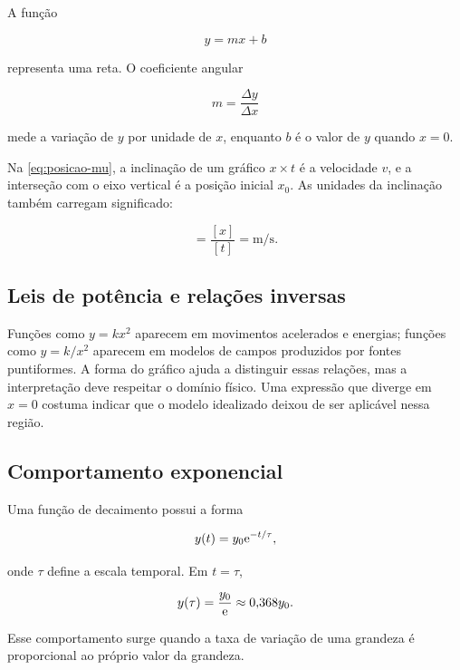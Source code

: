 A função

\begin{equation}
  y=mx+b
\end{equation}

representa uma reta. O coeficiente angular

\begin{equation}
  m=\frac{\Delta y}{\Delta x}
\end{equation}

mede a variação de $y$ por unidade de $x$, enquanto $b$ é o valor de $y$ quando $x=0$.

Na \cref{eq:posicao-mu}, a inclinação de um gráfico $x\times t$ é a velocidade $v$, e a interseção com o eixo vertical é a posição inicial $x_0$. As unidades da inclinação também carregam significado:

\begin{equation}
  [v]=\frac{[x]}{[t]}=\si{\meter\per\second}.
\end{equation}

\subsection{Leis de potência e relações inversas}

Funções como $y=kx^2$ aparecem em movimentos acelerados e energias; funções como $y=k/x^2$ aparecem em modelos de campos produzidos por fontes puntiformes. A forma do gráfico ajuda a distinguir essas relações, mas a interpretação deve respeitar o domínio físico. Uma expressão que diverge em $x=0$ costuma indicar que o modelo idealizado deixou de ser aplicável nessa região.

\subsection{Comportamento exponencial}

Uma função de decaimento possui a forma

\begin{equation}
  y(t)=y_0\mathrm{e}^{-t/\tau},
\end{equation}

onde $\tau$ define a escala temporal. Em $t=\tau$,

\begin{equation}
  y(\tau)=\frac{y_0}{\mathrm{e}}\approx 0{,}368y_0.
\end{equation}

Esse comportamento surge quando a taxa de variação de uma grandeza é proporcional ao próprio valor da grandeza.

